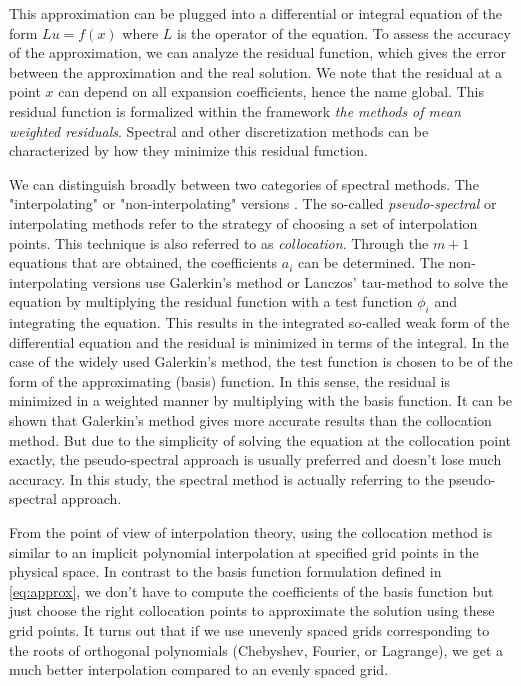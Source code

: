 This approximation can be plugged into a differential or integral equation of
the form $Lu=f(x)$ where $L$ is the operator of the equation. To assess the
accuracy of the approximation, we can analyze the residual function, which
gives the error between the approximation and the real solution. We note that
the residual at a point $x$ can depend on all expansion coefficients, hence the
name global. This residual function is formalized within the framework
\emph{the methods of mean weighted residuals}. Spectral and other
discretization methods can be characterized by how they minimize this residual
function. 

We can distinguish broadly between two categories of spectral methods. The
"interpolating" or "non-interpolating" versions \citep{boyd2001}. The so-called
\emph{pseudo-spectral} or interpolating methods refer to the strategy of
choosing a set of interpolation points. This technique is also referred to as
\emph{collocation}. Through the $m+1$ equations that are obtained, the
coefficients $a_i$ can be determined. The non-interpolating versions use
Galerkin's method or Lanczos' tau-method to solve the equation by multiplying
the residual function with a test function $\phi_i$ and integrating the
equation. This results in the integrated so-called weak form of the
differential equation and the residual is minimized in terms of the integral.
In the case of the widely used Galerkin's method, the test function is chosen
to be of the form of the approximating (basis) function. In this sense, the
residual is minimized in a weighted manner by multiplying with the basis
function. It can be shown that Galerkin's method gives more accurate results
than the collocation method. But due to the simplicity of solving the equation
at the collocation point exactly, the pseudo-spectral approach is usually
preferred and doesn't lose much accuracy. In this study, the spectral method is
actually referring to the pseudo-spectral approach.

From the point of view of interpolation theory, using the collocation method is
similar to an implicit polynomial interpolation at specified grid points in the
physical space. In contrast to the basis function formulation defined in
\eqref{eq:approx}, we don't have to compute the coefficients of the basis
function but just choose the right collocation points to approximate the
solution using these grid points. It turns out that if we use unevenly spaced
grids corresponding to the roots of orthogonal polynomials (Chebyshev, Fourier,
or Lagrange), we get a much better interpolation compared to an evenly spaced
grid.

